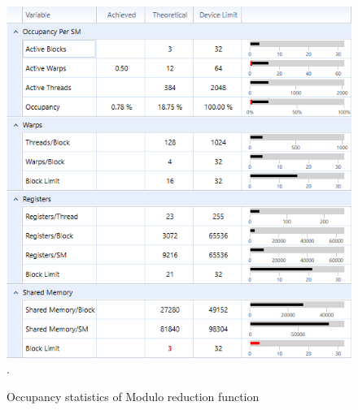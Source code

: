 \documentclass[oneside,openright,12pt,final,en]{mgr}
\begin{document}
\begin{figure}[H]
	\centering
	\includegraphics[width=\textwidth]{mod_occupancy}.
	\caption{Occupancy statistics of Modulo reduction function}
	\label{fig:mod_occupancy}
\end{figure}
\end{document}
